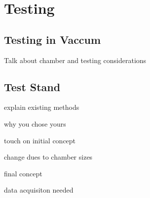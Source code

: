 \section{Testing}

\subsection{Testing in Vaccum}

Talk about chamber and testing considerations

\subsection{Test Stand}

explain existing methods

why you chose yours

touch on initial concept

change dues to chamber sizes

final concept

data acquisiton needed



